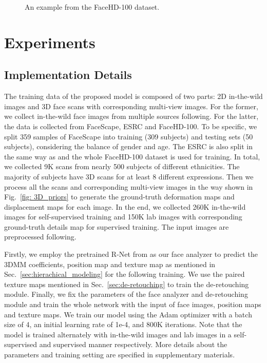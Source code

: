 \documentclass[10pt,twocolumn,letterpaper]{article}
\begin{document}
\begin{figure}[t]
  \centering
     \vspace{-10pt}
  \caption{An example from the FaceHD-100 dataset.}
  \label{fig: dataset}
  \vspace{-10pt}
\end{figure} 


\section{Experiments}
\subsection{Implementation Details}
 The training data of the proposed model is composed of two parts: 2D in-the-wild images and 3D face scans with corresponding multi-view images. For the former, we collect in-the-wild face images from multiple sources following\cite{deng2019accurate}. For the latter, the data is collected from FaceScape\cite{zhu2021facescape}, ESRC\cite{ESRC} and FaceHD-100. To be specific, we split 359 samples of FaceScape into training (309 subjects) and testing sets (50 subjects), considering the balance of gender and age. The ESRC is also split in the same way as\cite{bai2020deep} and the whole FaceHD-100 dataset is used for training. In total, we collected 9K scans from nearly 500 subjects of different ethnicities. The majority of subjects have 3D scans for at least 8 different expressions. Then we process all the scans and corresponding multi-view images in the way shown in Fig.~\ref{fig: 3D_priors} to generate the ground-truth deformation maps and displacement maps for each image. In the end, we collected 260K in-the-wild images for self-supervised training and 150K lab images with corresponding ground-truth details map for supervised training. The input images are preprocessed following\cite{deng2019accurate}.

 Firstly, we employ the pretrained R-Net from\cite{deng2019accurate} as our face analyzer to predict the 3DMM coefficients, position map and texture map as mentioned in Sec.~\ref{sec:hierachical_modeling} for the following training. We use the paired texture maps mentioned in Sec.~\ref{sec:de-retouching} to train the de-retouching module. Finally, we fix the parameters of the face analyzer and de-retouching module and train the whole network with the input of face images, position maps and texture maps. We train our model using the Adam optimizer with a batch size of 4, an initial learning rate of 1e-4, and 800K iterations. Note that the model is trained alternately with in-the-wild images and lab images in a self-supervised and supervised manner respectively. More details about the parameters and training setting are specified in supplementary materials.
\end{document}
